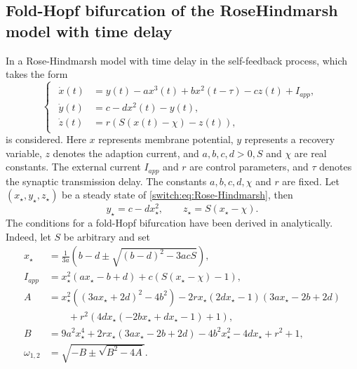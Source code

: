 \subsection{Fold-Hopf bifurcation of the Rose\textendash Hindmarsh model with time delay}
\label{switch:sec:ex_Rose_Hindmarsh}
In \cite{Ma2011} a Rose-Hindmarsh model \cite{Hindmarsh1982,Hindmarsh1984} with time delay in the self-feedback process, which takes the form
\begin{equation}
\begin{cases}
\begin{aligned}
\dot{x}(t)& = y(t)-ax^{3}(t)+bx^{2}(t-\tau)-cz(t)+I_{app},\\
\dot{y}(t)& = c-dx^{2}(t)-y(t),\\
\dot{z}(t)& = r(S(x(t)-\chi)-z(t)),
\end{aligned}
\end{cases}\label{switch:eq:Rose-Hindmarsh}
\end{equation}
is considered. Here $x$ represents membrane potential, $y$ represents a recovery variable, $z$ denotes the adaption current, and $a,b,c,d>0,S$ and $\chi$ are real constants. The external current $I_{app}$ and $r$ are control parameters, and $\tau$ denotes the synaptic transmission delay. The constants $a,b,c,d,\chi$ and $r$ are fixed. Let $(x_{\star},y_{\star},z_{\star})$ be a steady state of \cref{switch:eq:Rose-Hindmarsh}, then
\begin{equation} \label{switch:eq:ystar_zstar}
y_{\star}=c-dx_{\star}^{2},\qquad z_{\star}=S(x_{\star}-\chi).
\end{equation}
The conditions for a fold-Hopf bifurcation have been derived in \cite{Ma2011} analytically. Indeed, let $S$ be arbitrary and set
\begin{align}
x_{\star} & =\frac{1}{3a}\left(b-d\pm\sqrt{\left(b-d\right)^{2}-3acS}\right), \nonumber \\
I_{app} & =x_{\star}^{2}(ax_{\star}-b+d)+c(S(x_{\star}-\chi)-1), \label{switch:eq:I_app}  \\
A & =x_{\star}^{2}\left((3ax_{\star}+2d)^{2}-4b^{2}\right)-2rx_{\star}(2dx_{\star}-1)(3ax_{\star}-2b+2d) \nonumber \\
 & \qquad+r^{2}(4dx_{\star}(-2bx_{\star}+dx_{\star}-1)+1),\nonumber \\
B & =9a^{2}x_{\star}^{4}+2rx_{\star}(3ax_{\star}-2b+2d)-4b^{2}x_{\star}^{2}-4dx_{\star}+r^{2}+1,\nonumber  \\
\omega_{1,2} & =\sqrt{-B\pm\sqrt{B^{2}-4A}}. \nonumber
\end{align}

